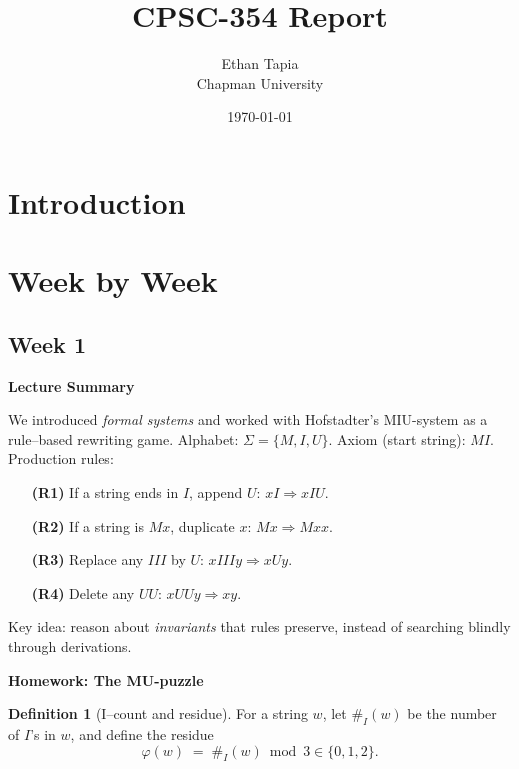 \documentclass{article}
\title{CPSC-354 Report}
\author{Ethan Tapia  \\ Chapman University}
\date{\today}
\theoremstyle{theorem}
\theoremstyle{definition}
\newtheorem{definition}[theorem]{Definition}
\theoremstyle{remark}
\begin{document}
\maketitle

\begin{abstract}
\end{abstract}

\setcounter{tocdepth}{3}
\tableofcontents

\section{Introduction}\label{intro}

\section{Week by Week}\label{homework}

\subsection{Week 1}

\textbf{Lecture Summary}

We introduced \emph{formal systems} and worked with Hofstadter’s MIU-system as a rule–based rewriting game.  
Alphabet: $\Sigma=\{M,I,U\}$.  
Axiom (start string): $MI$.  
Production rules:
\begin{enumerate}
    \item[\textbf{(R1)}] If a string ends in $I$, append $U$: $xI \Rightarrow xIU$.
    \item[\textbf{(R2)}] If a string is $Mx$, duplicate $x$: $Mx \Rightarrow Mxx$.
    \item[\textbf{(R3)}] Replace any $III$ by $U$: $xIIIy \Rightarrow xUy$.
    \item[\textbf{(R4)}] Delete any $UU$: $xUUy \Rightarrow xy$.
\end{enumerate}
Key idea: reason about \emph{invariants} that rules preserve, instead of searching blindly through derivations.

\bigskip
\textbf{Homework: The MU-puzzle}

\begin{definition}[I–count and residue]
For a string $w$, let $\#_I(w)$ be the number of $I$’s in $w$, and define the residue
\[
\varphi(w) \;=\; \#_I(w) \bmod 3 \in \{0,1,2\}.
\]
\end{definition}
\end{document}
